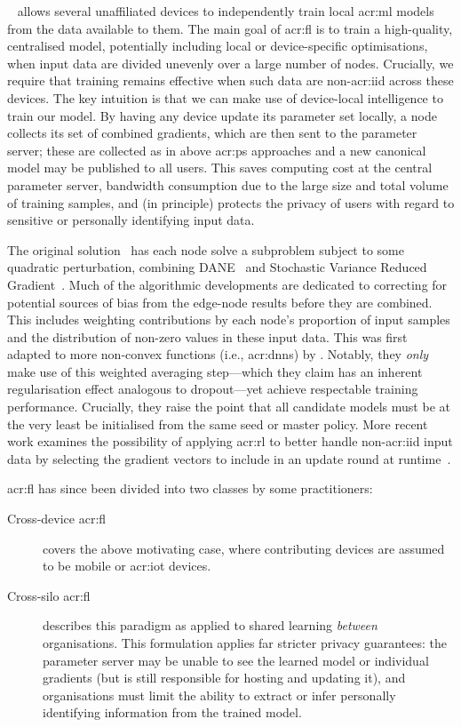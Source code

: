 ~\parencite{DBLP:journals/corr/KonecnyMRR16,DBLP:journals/corr/Konecny17,DBLP:conf/mlsys/BonawitzEGHIIKK19} allows several unaffiliated devices to independently train local \gls{acr:ml} models from the data available to them.
The main goal of \gls{acr:fl} is to train a high-quality, centralised model, potentially including local or device-specific optimisations, when input data are divided unevenly over a large number of nodes.
Crucially, we require that training remains effective when such data are non-\gls{acr:iid} across these devices.
The key intuition is that we can make use of device-local intelligence to train our model.
By having any device update its parameter set locally, a node collects its set of combined gradients, which are then sent to the parameter server; these are collected as in above \gls{acr:ps} approaches and a new canonical model may be published to all users.
This saves computing cost at the central parameter server, bandwidth consumption due to the large size and total volume of training samples, and (in principle) protects the privacy of users with regard to sensitive or personally identifying input data.

The original solution~\parencite{DBLP:journals/corr/KonecnyMRR16} has each node solve a subproblem subject to some quadratic perturbation, combining DANE~\parencite{DBLP:conf/icml/ShamirS014} and Stochastic Variance Reduced Gradient~\parencite{DBLP:conf/nips/Johnson013}.
Much of the algorithmic developments are dedicated to correcting for potential sources of bias from the edge-node results before they are combined.
This includes weighting contributions by each node's proportion of input samples and the distribution of non-zero values in these input data.
This was first adapted to more non-convex functions (i.e., \glspl{acr:dnn}) by \textcite{DBLP:conf/aistats/McMahanMRHA17}.
Notably, they \emph{only} make use of this weighted averaging step---which they claim has an inherent regularisation effect analogous to dropout---yet achieve respectable training performance.
Crucially, they raise the point that all candidate models must be at the very least be initialised from the same seed or master policy.
More recent work examines the possibility of applying \gls{acr:rl} to better handle non-\gls{acr:iid} input data by selecting the gradient vectors to include in an update round at runtime~\parencite{DBLP:conf/infocom/WangKNL20}.

\gls{acr:fl} has since been divided into two classes by some practitioners:
\begin{description}
	\item[Cross-device \gls{acr:fl}] covers the above motivating case, where contributing devices are assumed to be mobile or \gls{acr:iot} devices.
	\item[Cross-silo \gls{acr:fl}] describes this paradigm as applied to shared learning \emph{between} organisations. This formulation applies far stricter privacy guarantees: the parameter server may be unable to see the learned model or individual gradients (but is still responsible for hosting and updating it), and organisations must limit the ability to extract or infer personally identifying information from the trained model.
\end{description}

